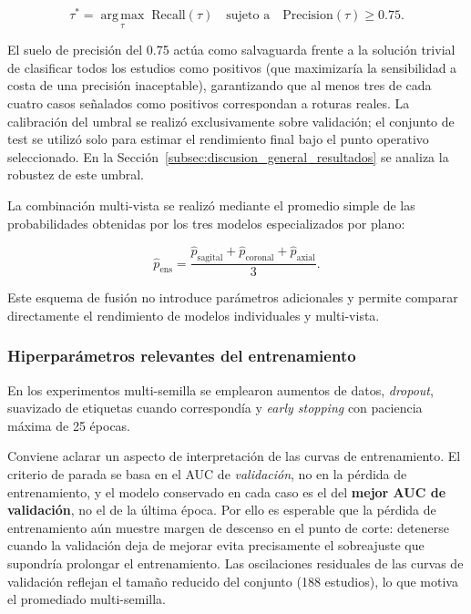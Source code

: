 \begin{equation}
\tau^* =
\operatorname*{arg\,max}_{\tau} \; \mathrm{Recall}(\tau)
\quad
\text{sujeto a}
\quad
\mathrm{Precision}(\tau) \geq 0.75 .
\label{eq:threshold_clinico}
\end{equation}

El suelo de precisión del 0.75 actúa como salvaguarda frente a la solución trivial de clasificar todos los estudios como positivos (que maximizaría la sensibilidad a costa de una precisión inaceptable), garantizando que al menos tres de cada cuatro casos señalados como positivos correspondan a roturas reales. La calibración del umbral se realizó exclusivamente sobre validación; el conjunto de test se utilizó solo para estimar el rendimiento final bajo el punto operativo seleccionado. En la Sección~\ref{subsec:discusion_general_resultados} se analiza la robustez de este umbral.

La combinación multi-vista se realizó mediante el promedio simple de las probabilidades obtenidas por los tres modelos especializados por plano:

\begin{equation}
\hat{p}_{\mathrm{ens}} =
\frac{
\hat{p}_{\mathrm{sagital}} +
\hat{p}_{\mathrm{coronal}} +
\hat{p}_{\mathrm{axial}}
}{3}.
\label{eq:ensemble_promedio}
\end{equation}

Este esquema de fusión no introduce parámetros adicionales y permite comparar directamente el rendimiento de modelos individuales y multi-vista.

\subsubsection{Hiperparámetros relevantes del entrenamiento}

En los experimentos multi-semilla se emplearon aumentos de datos, \textit{dropout}, suavizado de etiquetas cuando correspondía y \textit{early stopping} con paciencia máxima de 25 épocas.

Conviene aclarar un aspecto de interpretación de las curvas de entrenamiento. El criterio de parada se basa en el AUC de \textit{validación}, no en la pérdida de entrenamiento, y el modelo conservado en cada caso es el del \textbf{mejor AUC de validación}, no el de la última época. Por ello es esperable que la pérdida de entrenamiento aún muestre margen de descenso en el punto de corte: detenerse cuando la validación deja de mejorar evita precisamente el sobreajuste que supondría prolongar el entrenamiento. Las oscilaciones residuales de las curvas de validación reflejan el tamaño reducido del conjunto (188 estudios), lo que motiva el promediado multi-semilla.

